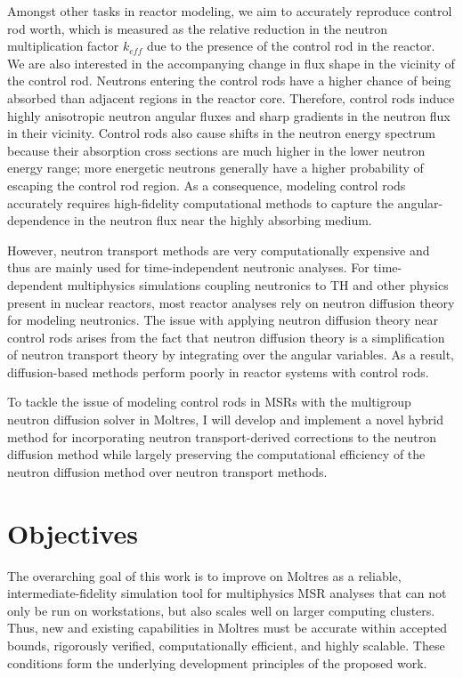 Amongst other tasks in reactor modeling, we aim to accurately reproduce control rod worth, which is
measured as the relative reduction
in the neutron multiplication factor $k_{eff}$ due to the presence of the control rod in the
reactor. We are also interested in the accompanying change in flux shape in the vicinity of the
control rod. Neutrons entering the control rods have a higher chance of being absorbed than
adjacent regions in the reactor core. Therefore, control rods induce highly anisotropic neutron
angular fluxes and sharp gradients in the neutron flux in their vicinity. Control rods also cause
shifts in the neutron energy spectrum because their absorption cross sections are much higher in
the lower neutron energy range; more energetic neutrons generally have a higher probability of
escaping the control rod region. As a consequence, modeling control rods accurately requires
high-fidelity computational methods to capture the angular-dependence in the neutron
flux near the highly absorbing medium.

However, neutron transport methods are very computationally expensive and thus are mainly used for
time-independent neutronic analyses. For time-dependent multiphysics simulations coupling
neutronics to \gls{TH} and other physics present in nuclear reactors, most reactor analyses
rely on neutron diffusion theory for modeling neutronics. The issue with applying neutron diffusion
theory near control rods arises from the fact that neutron diffusion theory is a
simplification of neutron transport theory by integrating over the angular variables. As a result,
diffusion-based methods perform poorly in reactor systems with control rods.

To tackle the issue of modeling control rods in \glspl{MSR} with the multigroup neutron diffusion
solver in Moltres, I will develop and implement a novel hybrid method for incorporating neutron
transport-derived corrections to the neutron diffusion method while largely preserving the
computational efficiency of the neutron diffusion method over neutron transport methods.

\section{Objectives}

The overarching goal of this work is to improve on Moltres as a reliable, intermediate-fidelity
simulation tool for multiphysics \gls{MSR} analyses that can not only be run on workstations, but
also scales well on larger computing clusters. Thus, new and existing capabilities in Moltres must
be accurate within accepted bounds, rigorously verified, computationally efficient, and highly
scalable. These conditions form the underlying development principles of the proposed work.

